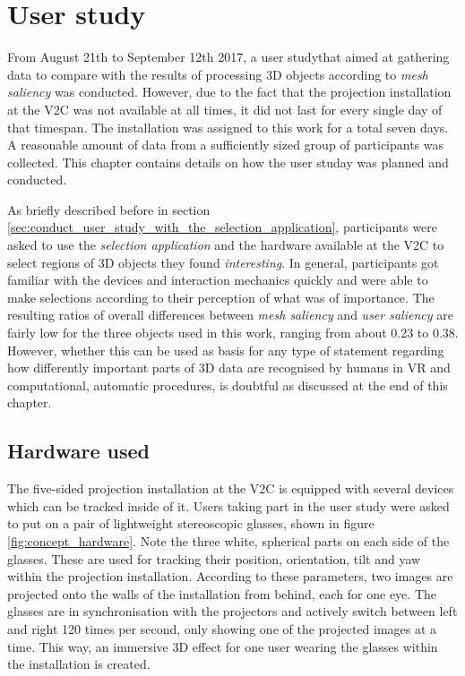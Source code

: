 \chapter{User study}
\label{sec:user_study_chapter}
%
%

From August 21th to September 12th 2017, a user studythat aimed at gathering data to compare with the results of processing 3D objects according to \textit{mesh saliency} \cite{lee2005mesh} was conducted. However, due to the fact that the projection installation at the V2C was not available at all times, it did not last for every single day of that timespan. The installation was assigned to this work for a total seven days. A reasonable amount of data from a sufficiently sized group of participants was collected. This chapter contains details on how the user studay was planned and conducted.

As briefly described before in section \ref{sec:conduct_user_study_with_the_selection_application}, participants were asked to use the \textit{selection application} and the hardware available at the V2C to select regions of 3D objects they found \textit{interesting}. In general, participants got familiar with the devices and interaction mechanics quickly and were able to make selections according to their perception of what was of importance. The resulting ratios of overall differences between \textit{mesh saliency} and \textit{user saliency} are fairly low for the three objects used in this work, ranging from about 0.23 to 0.38. However, whether this can be used as basis for any type of statement regarding how differently important parts of 3D data are recognised by humans in VR and computational, automatic procedures, is doubtful as discussed at the end of this chapter.

	\section{Hardware used}
	\label{sec:hardware_used}
%
%

The five-sided projection installation at the V2C is equipped with several devices which can be tracked inside of it. Users taking part in the user study were asked to put on a pair of lightweight stereoscopic glasses, shown in figure \ref{fig:concept_hardware}. Note the three white, spherical parts on each side of the glasses. These are used for tracking their position, orientation, tilt and yaw within the projection installation. According to these parameters, two images are projected onto the walls of the installation from behind, each for one eye. The glasses are in synchronisation with the projectors and actively switch between left and right 120 times per second, only showing one of the projected images at a time. This way, an immersive 3D effect for one user wearing the glasses within the installation is created.  

